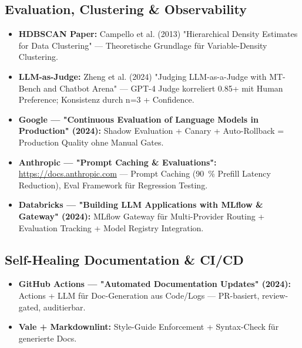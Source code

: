 \subsection*{Evaluation, Clustering \& Observability}
\begin{itemize}[leftmargin=*]
    \item \textbf{HDBSCAN Paper:} Campello et al. (2013) "Hierarchical Density Estimates for Data Clustering" — Theoretische Grundlage für Variable-Density Clustering.
    \item \textbf{LLM-as-Judge:} Zheng et al. (2024) "Judging LLM-as-a-Judge with MT-Bench and Chatbot Arena" — GPT-4 Judge korreliert 0.85+ mit Human Preference; Konsistenz durch n=3 + Confidence.
    \item \textbf{Google — "Continuous Evaluation of Language Models in Production" (2024):} Shadow Evaluation + Canary + Auto-Rollback = Production Quality ohne Manual Gates.
    \item \textbf{Anthropic — "Prompt Caching \& Evaluations":} \url{https://docs.anthropic.com} — Prompt Caching (90~\% Prefill Latency Reduction), Eval Framework für Regression Testing.
    \item \textbf{Databricks — "Building LLM Applications with MLflow \& Gateway" (2024):} MLflow Gateway für Multi-Provider Routing + Evaluation Tracking + Model Registry Integration.
\end{itemize}

\subsection*{Self-Healing Documentation \& CI/CD}
\begin{itemize}[leftmargin=*]
    \item \textbf{GitHub Actions — "Automated Documentation Updates" (2024):} Actions + LLM für Doc-Generation aus Code/Logs — PR-basiert, review-gated, auditierbar.
    \item \textbf{Vale + Markdownlint:} Style-Guide Enforcement + Syntax-Check für generierte Docs.
\end{itemize}

